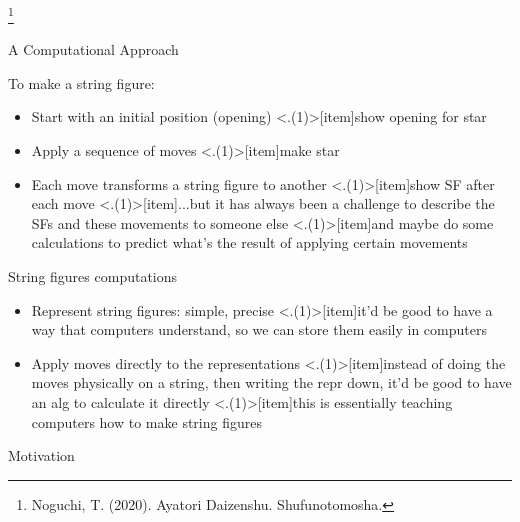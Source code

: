 \begin{frame}{\secname}
\footnote<2->{Noguchi, T. (2020). Ayatori Daizenshu. Shufunotomosha. }

\end{frame}



\begin{frame}{A Computational Approach}


\pause To make a string figure:

\begin{itemize}[<+(1)->]
    \item Start with an initial position (opening)
    \note<.(1)>[item]{show opening for star}
    \item Apply a sequence of moves
    \note<.(1)>[item]{make star}
    \item Each move transforms a string figure to another
    \note<.(1)>[item]{show SF after each move}
    \note<.(1)>[item]{...but it has always been a challenge to describe the SFs and these movements to someone else}
    \note<.(1)>[item]{and maybe do some calculations to predict what's the result of applying certain movements}
\end{itemize}

\pause String figures computations

\begin{itemize}[<+(1)->]
    \item Represent string figures: simple, precise
    \note<.(1)>[item]{it'd be good to have a way that computers understand, so we can store them easily in computers}
    \item Apply moves directly to the representations
    \note<.(1)>[item]{instead of doing the moves physically on a string, then writing the repr down, it'd be good to have an alg to calculate it directly}
    \note<.(1)>[item]{this is essentially teaching computers how to make string figures}
\end{itemize}

\pause Motivation


\end{frame}
